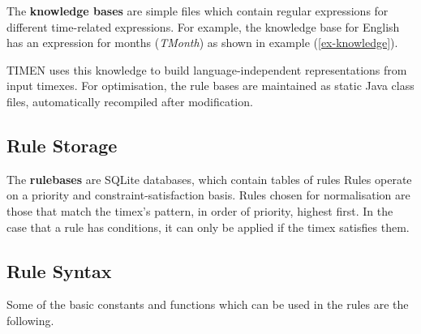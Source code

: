 \documentclass[10pt, a4paper]{article}
\begin{document}
The \textbf{knowledge bases} are simple files which contain regular expressions for different time-related expressions. For example, the knowledge base for English has an expression for months (\textit{TMonth}) as shown in example (\ref{ex-knowledge}).

\footnotesize
{}\label{ex-knowledge}
\normalsize

TIMEN uses this knowledge to build language-independent representations from input timexes. For optimisation, the rule bases are maintained as static Java class files, automatically recompiled after modification.

\subsection{Rule Storage}
The \textbf{rulebases} are SQLite databases, which contain tables of rules
Rules operate on a priority and constraint-satisfaction basis. Rules chosen for normalisation are those that match the timex's pattern, in order of priority, highest first.
In the case that a rule has conditions, it can only be applied if the timex satisfies them.

\subsection{Rule Syntax}
Some of the basic constants and functions which can be used in the rules are the following.
\end{document}
